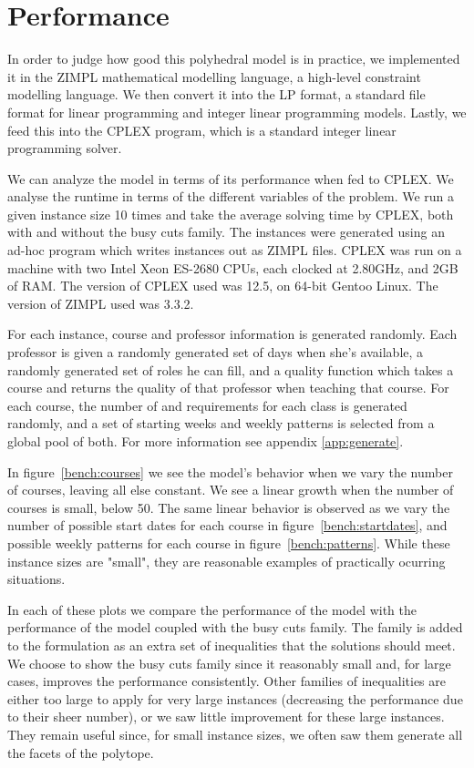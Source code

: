 \newpage
\section{Performance}

In order to judge how good this polyhedral model is in practice, we implemented it in the ZIMPL mathematical modelling language, a high-level constraint modelling language. We then convert it into the LP format, a standard file format for linear programming and integer linear programming models. Lastly, we feed this into the CPLEX program, which is a standard integer linear programming solver.

We can analyze the model in terms of its performance when fed to CPLEX. We analyse the runtime in terms of the different variables of the problem. We run a given instance size 10 times and take the average solving time by CPLEX, both with and without the busy cuts family. The instances were generated using an ad-hoc program which writes instances out as ZIMPL files. CPLEX was run on a machine with two Intel Xeon ES-2680 CPUs, each clocked at 2.80GHz, and 2GB of RAM. The version of CPLEX used was 12.5, on 64-bit Gentoo Linux. The version of ZIMPL used was 3.3.2.

For each instance, course and professor information is generated randomly. Each professor is given a randomly generated set of days when she's available, a randomly generated set of roles he can fill, and a quality function which takes a course and returns the quality of that professor when teaching that course. For each course, the number of and requirements for each class is generated randomly, and a set of starting weeks and weekly patterns is selected from a global pool of both. For more information see appendix \ref{app:generate}.

In figure~\ref{bench:courses} we see the model's behavior when we vary the number of courses, leaving all else constant. We see a linear growth when the number of courses is small, below 50. The same linear behavior is observed as we vary the number of possible start dates for each course in figure~\ref{bench:startdates}, and possible weekly patterns for each course in figure~\ref{bench:patterns}. While these instance sizes are "small", they are reasonable examples of practically ocurring situations.

In each of these plots we compare the performance of the model with the performance of the model coupled with the busy cuts family. The family is added to the formulation as an extra set of inequalities that the solutions should meet. We choose to show the busy cuts family since it reasonably small and, for large cases, improves the performance consistently. Other families of inequalities are either too large to apply for very large instances (decreasing the performance due to their sheer number), or we saw little improvement for these large instances. They remain useful since, for small instance sizes, we often saw them generate all the facets of the polytope.

